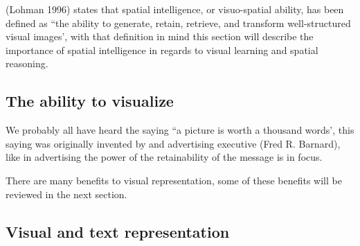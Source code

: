 (Lohman 1996) states that spatial intelligence, or visuo-spatial ability, has been defined as ``the ability to generate, retain, retrieve, and transform well-structured visual images'\cite[p97]{tapsfield1996}, with that definition in mind this section will describe the importance of spatial intelligence in regards to visual learning and spatial reasoning.


\subsection{The ability to visualize}\label{sec:the_ability_to_visualize}
We probably all have heard the saying ``a picture is worth a thousand words', this saying was originally invented by and advertising executive (Fred R. Barnard)\cite*{phrases2022}, like in advertising the power of the retainability of the message is in focus. 



There are many benefits to visual representation, some of these benefits will be reviewed in the next section.
\subsection{Visual and text representation}\label{sec:visual_and_text_representation}





